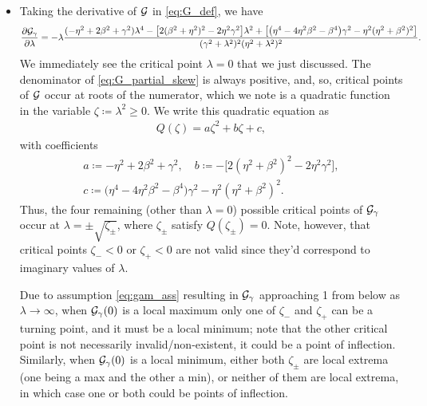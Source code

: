 \documentclass[a4paper,10pt]{article}
\begin{document}
{\begin{itemize}
\item Taking the derivative of ${\cal G}$ in \eqref{eq:G_def}, we have
\begin{align} \label{eq:G_partial_skew}
\frac{\partial {\cal G}_{\gamma}}{\partial \lambda} 
= 
-\lambda
\frac{
(-\eta^2 + 2 \beta^2 + \gamma^2)\lambda^4 
- \big[ 2(\beta^2 + \eta^2)^2 - 2 \eta^2 \gamma^2  \big] \lambda^2 
+ \big[ \big( \eta^4 - 4 \eta^2 \beta^2 - \beta^4 \big) \gamma^2  - \eta^2 (\eta^2 + \beta^2)^2 \big] }
{(\gamma^2 + \lambda^2)^2 (\eta^2 + \lambda^2)^2}.
\end{align}
We immediately see the critical point $\lambda = 0$ that we just discussed. 
%
The denominator of \eqref{eq:G_partial_skew} is always positive, and, so, critical points of ${\cal G}$ occur at roots of the numerator, which we note is a quadratic function in the variable $\zeta \coloneqq \lambda^2 \geq 0$. We write this quadratic equation as
\begin{align}
\label{eq:Q_def_skew}
Q(\zeta) = a \zeta^2 + b \zeta + c,
\end{align}
with coefficients
\begin{equation}
\begin{gathered}
\label{eq:abc_def}
a \coloneqq -\eta^2 + 2 \beta^2 + \gamma^2, 
\quad
b \coloneqq - \big[ 2(\eta^2 + \beta^2)^2 - 2 \eta^2 \gamma^2  \big], \\
c \coloneqq \big( \eta^4 - 4 \eta^2 \beta^2 - \beta^4 \big) \gamma^2  - \eta^2 (\eta^2 + \beta^2)^2.
\end{gathered}
\end{equation}
Thus, the four remaining (other than $\lambda = 0$) possible critical points of ${\cal G}_{\gamma}$ occur at $\lambda = \pm \sqrt{\zeta_{\pm}}$, where $\zeta_{\pm}$ satisfy $Q(\zeta_{\pm}) = 0$. Note, however, that critical points $\zeta_{-} < 0$ or $\zeta_+ < 0$ are not valid since they'd correspond to imaginary values of $\lambda$.

Due to assumption \eqref{eq:gam_ass} resulting in ${\cal G}_{\gamma}$ approaching 1 from below as $\lambda \to \infty$, when ${\cal G}_{\gamma}(0)$ is a local maximum only one of $\zeta_-$ and $\zeta_+$ can be a turning point, and it must be a local minimum; note that the other critical point is not necessarily invalid/non-existent, it could be a point of inflection. Similarly, when ${\cal G}_{\gamma}(0)$ is a local minimum, either both $\zeta_{\pm}$ are local extrema (one being a max and the other a min), or neither of them are local extrema, in which case one or both could be points of inflection.


\end{itemize}}
\end{document}
